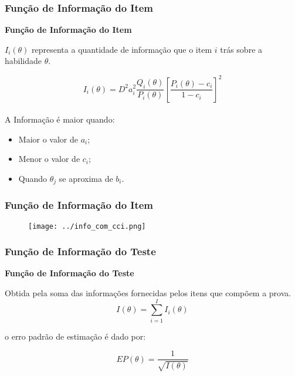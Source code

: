 \documentclass{beamer}
\begin{document}
	\begin{frame}
		
		\frametitle{Função de Informação do Item}
		
		\begin{center}
			\textbf{Função de Informação do Item}
		\end{center}
		
		$I_i(\theta)$ representa a quantidade de informação que o item $i$ trás sobre a
		habilidade $\theta$.
		
		\[
		I_i(\theta) =  D^2 a_i^2\frac{Q_i(\theta)}{P_i(\theta)} \left[\frac{P_i(\theta) - c_i}{1 - c_i}\right]^2
		\] \\ \pause	
				A Informação é maior quando:
		
		\begin{itemize}
			\item<1-> Maior o valor de $a_i$;
			\item<1-> Menor o valor de $c_i$;
			\item<1-> Quando $\theta_j$  se aproxima de $b_i$.
			
		\end{itemize}

	\end{frame}
	
	
	\begin{frame}
		
		\frametitle{Função de Informação do Item}

		\begin{figure}
			\texttt{[image: ../info\_com\_cci.png]}
		\end{figure}
		
	\end{frame}
	
	\begin{frame}
			
			\frametitle{Função de Informação do Teste}
			
		\begin{center}
				\textbf{Função de Informação do Teste}
		\end{center}
		
		Obtida pela soma das informações fornecidas pelos itens que compõem a prova.	
			\[
			I(\theta) = \sum_{i=1}^{I}I_i(\theta)
			\]
	
		o erro padrão de estimação é dado por:
			
			\[
			EP(\theta) = \dfrac{1}{\sqrt{I(\theta)}}
			\]
			
	\end{frame}	
		
\end{document}
